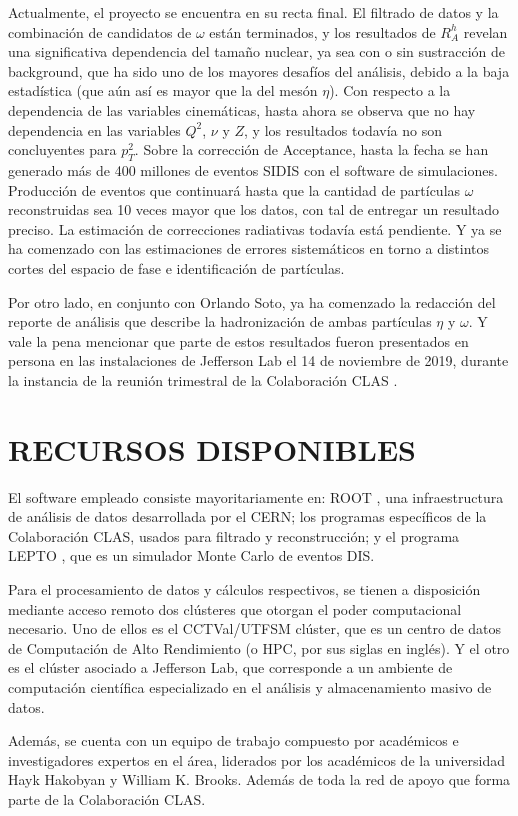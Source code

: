Actualmente, el proyecto se encuentra en su recta final. El filtrado de datos y la combinación de candidatos de $\omega$ están terminados, y los resultados de $R^h_A$ revelan una significativa dependencia del tamaño nuclear, ya sea con o sin sustracción de background, que ha sido uno de los mayores desafíos del análisis, debido a la baja estadística (que aún así es mayor que la del mesón $\eta$). Con respecto a la dependencia de las variables cinemáticas, hasta ahora se observa que no hay dependencia en las variables $Q^2$, $\nu$ y $Z$, y los resultados todavía no son concluyentes para $p_T^2$. Sobre la corrección de Acceptance, hasta la fecha se han generado más de 400 millones de eventos SIDIS con el software de simulaciones. Producción de eventos que continuará hasta que la cantidad de partículas $\omega$ reconstruidas sea 10 veces mayor que los datos, con tal de entregar un resultado preciso. La estimación de correcciones radiativas todavía está pendiente. Y ya se ha comenzado con las estimaciones de errores sistemáticos en torno a distintos cortes del espacio de fase e identificación de partículas.

Por otro lado, en conjunto con Orlando Soto, ya ha comenzado la redacción del reporte de análisis que describe la hadronización de ambas partículas $\eta$ y $\omega$. Y vale la pena mencionar que parte de estos resultados fueron presentados en persona en las instalaciones de Jefferson Lab el 14 de noviembre de 2019, durante la instancia de la reunión trimestral de la Colaboración CLAS \cite{pres}.

\section{RECURSOS DISPONIBLES}

El software empleado consiste mayoritariamente en: ROOT \cite{root}, una infraestructura de análisis de datos desarrollada por el CERN; los programas específicos de la Colaboración CLAS, usados para filtrado y reconstrucción; y el programa LEPTO \cite{lepto}, que es un simulador Monte Carlo de eventos DIS.

Para el procesamiento de datos y cálculos respectivos, se tienen a disposición mediante acceso remoto dos clústeres que otorgan el poder computacional necesario. Uno de ellos es el CCTVal/UTFSM clúster, que es un centro de datos de Computación de Alto Rendimiento (o HPC, por sus siglas en inglés). Y el otro es el clúster asociado a Jefferson Lab, que corresponde a un ambiente de computación científica especializado en el análisis y almacenamiento masivo de datos.

Además, se cuenta con un equipo de trabajo compuesto por académicos e investigadores expertos en el área, liderados por los académicos de la universidad Hayk Hakobyan y William K. Brooks. Además de toda la red de apoyo que forma parte de la Colaboración CLAS.